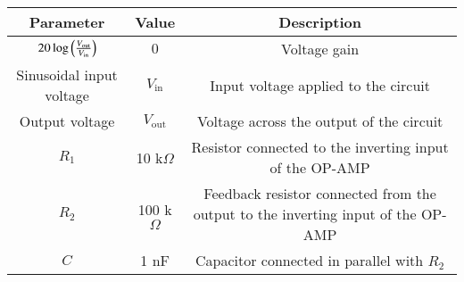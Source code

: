 
\begin{tabular}{|c|c|c|}
\hline
\textbf{Parameter} &  \textbf{Value} & \textbf{Description} \\
\hline
 $20 \log \left(\frac{V_{\text{out}}}{V_{\text{in}}}\right)$ & $0$ &Voltage gain\\
\hline
 Sinusoidal input voltage & $V_{\text{in}}$ & Input voltage applied to the circuit \\
\hline
 Output voltage & $V_{\text{out}}$ & Voltage across the output of the circuit \\
\hline
$R_1$ & 10 k$\Omega$ & Resistor connected to the inverting input of the OP-AMP \\
\hline
$R_2$ & 100 k$\Omega$ & Feedback resistor connected from the output to the inverting input of the OP-AMP \\
\hline
$C$ & 1 nF & Capacitor connected in parallel with $R_2$ \\
 \hline
\end{tabular}


